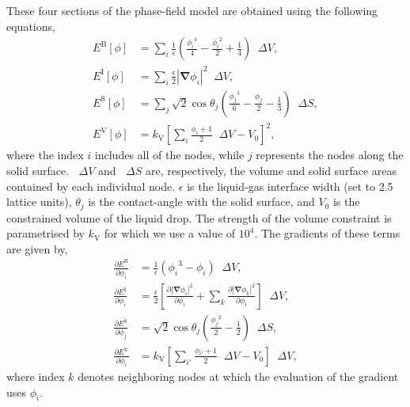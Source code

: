 \documentclass[aip,jcp,reprint,twocolumn]{revtex4-1}
\newcommand{\abs}[1]{\left| #1 \right|}
\newcommand{\grad}{\bm{\nabla}}
\newcommand{\upDelta}{\mathop{}\!\Delta}
\begin{document}
These four sections of the phase-field model are obtained using the following equations,
\begin{align}
  E^\mathrm{B}[\phi] &= \sum_i \frac{1}{\epsilon} \left( \frac{{\phi_i}^4}{4} - \frac{{\phi_i}^2}{2} + \frac{1}{4} \right) \upDelta V,\\
  E^\mathrm{I}[\phi] &= \sum_i \frac{\epsilon}{2} \abs{\grad \phi_i}^2 \upDelta V,\\
  E^\mathrm{S}[\phi] &= \sum_j \sqrt{2}\cos\theta_j \left( \frac{{\phi_j}^3}{6} - \frac{\phi_j}{2} - \frac{1}{3} \right) \upDelta S,\\
  E^\mathrm{V}[\phi] &= k_\mathrm{V} \left[ \sum_i \frac{\phi_i + 1}{2} \upDelta V - V_0 \right]^2,
\end{align}
where the index $i$ includes all of the nodes, while $j$ represents the nodes along the solid surface.
$\upDelta V$ and $\upDelta S$ are, respectively, the volume and solid surface areas contained by each individual node.
$\epsilon$ is the liquid-gas interface width (set to 2.5 lattice units), $\theta_j$ is the contact-angle with the solid surface, and $V_0$ is the constrained volume of the liquid drop.
The strength of the volume constraint is parametrised by $k_\mathrm{V}$ for which we use a value of $10^4$.
The gradients of these terms are given by,
\begin{align}
  \frac{\partial E^\mathrm{B}}{\partial \phi_i} &= \frac{1}{\epsilon} \left( {\phi_i}^3 - \phi_i \right) \upDelta V,\\
  \frac{\partial E^\mathrm{I}}{\partial \phi_i} &= \frac{\epsilon}{2} \left[
    \frac{\partial \abs{\grad \phi_i}^2}{\partial \phi_i} +
    \sum_k\frac{\partial \abs{\grad \phi_k}^2}{\partial \phi_i} \right] \upDelta V,\\
  \frac{\partial E^\mathrm{S}}{\partial \phi_j} &= \sqrt{2}\cos\theta_j \left( \frac{{\phi_j}^2}{2} - \frac{1}{2} \right) \upDelta S,\\
  \frac{\partial E^\mathrm{V}}{\partial \phi_i} &= k_\mathrm{V} \left[ \sum_{i'} \frac{\phi_{i'} + 1}{2} \upDelta V - V_0 \right] \upDelta V,
\end{align}
where index $k$ denotes neighboring nodes at which the evaluation of the gradient uses $\phi_i$.

% 

\end{document}
